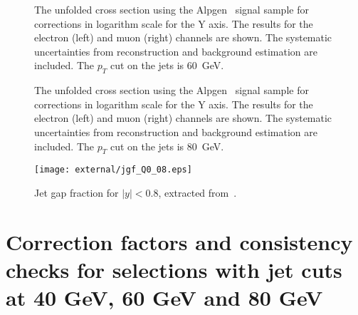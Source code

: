 \begin{sidewaysfigure}[htbp]
\centering
{}
\caption{The unfolded cross section using the Alpgen  \ttbar\ signal sample for corrections in logarithm
  scale for the Y axis.  The results for
  the electron (left) and muon (right) channels are shown. The systematic
  uncertainties from reconstruction and background estimation are
  included. The $p_T$ cut on the jets is 60~GeV. }
\label{fig:xsMethodBunfolded60log}
\end{sidewaysfigure}

\begin{sidewaysfigure}[htbp]
\centering
{}
\caption{The unfolded cross section using the Alpgen  \ttbar\ signal sample for corrections in logarithm
  scale for the Y axis.  The results for
  the electron (left) and muon (right) channels are shown. The systematic
  uncertainties from reconstruction and background estimation are
  included. The $p_T$ cut on the jets is 80~GeV. }
\label{fig:xsMethodBunfolded80log}
\end{sidewaysfigure}

\clearpage

\begin{figure}[htbp]
\centering
\texttt{[image: external/jgf\_Q0\_08.eps]}
\caption{Jet gap fraction for $|y| < 0.8$, extracted from~\cite{gapfraction}.}
\label{fig:jgf_Q0_08}
\end{figure}

\clearpage

\section{Correction factors and consistency checks for selections with jet cuts at 40 GeV, 60 GeV and 80 GeV}
\label{subsec:methodBotherpt}

